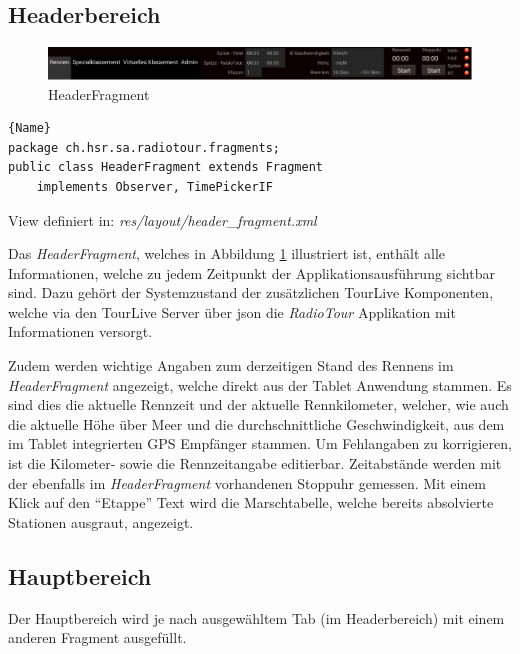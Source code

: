 \subsection{Headerbereich}

\begin{figure}[h!]
\caption{HeaderFragment}
\label{fig:headerbereich}
\centering
\includegraphics[scale=0.8]{07anhang/images/dev_header.png}
\end{figure}


\begin{lstlisting}{Name}
package ch.hsr.sa.radiotour.fragments;
public class HeaderFragment extends Fragment
	implements Observer, TimePickerIF
\end{lstlisting}

View definiert in:
\textit{res/layout/header\_fragment.xml}

Das \textit{HeaderFragment}, welches in Abbildung \ref{fig:headerbereich} illustriert ist, enthält alle Informationen, welche zu jedem Zeitpunkt der Applikationsausführung sichtbar sind. Dazu gehört der Systemzustand der zusätzlichen TourLive Komponenten, welche via den TourLive Server über \gls{json} die \textit{RadioTour} Applikation mit Informationen versorgt.

Zudem werden wichtige Angaben zum derzeitigen Stand des Rennens im \textit{HeaderFragment} angezeigt, welche direkt aus der Tablet Anwendung stammen. Es sind dies die aktuelle Rennzeit und der aktuelle Rennkilometer, welcher, wie auch die aktuelle Höhe über Meer und die durchschnittliche Geschwindigkeit, aus dem im Tablet integrierten GPS Empfänger stammen. Um Fehlangaben zu korrigieren, ist die Kilometer- sowie die Rennzeitangabe editierbar.
Zeitabstände werden mit der ebenfalls im \textit{HeaderFragment} vorhandenen Stoppuhr gemessen. 
Mit einem Klick auf den "`Etappe"' Text wird die Marschtabelle, welche bereits absolvierte Stationen ausgraut, angezeigt.

\subsection{Hauptbereich}
Der Hauptbereich wird je nach ausgewähltem Tab (im Headerbereich) mit einem anderen Fragment ausgefüllt.
\\

